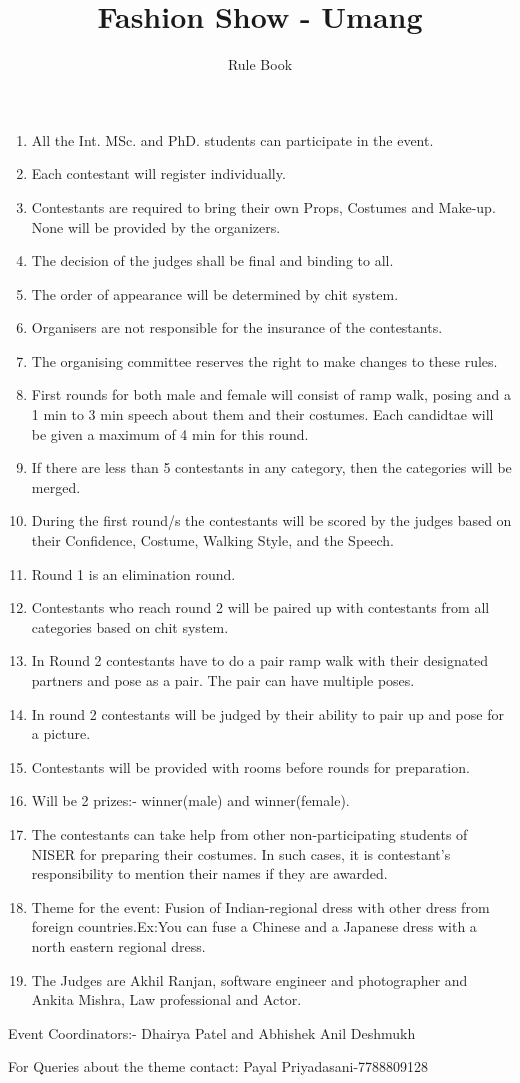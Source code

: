 \documentclass[a4paper, 11pt]{proc}
\begin{document}
\title{Fashion Show - Umang}
\author{Rule Book}
\maketitle
\begin{enumerate}
	\item All the Int. MSc. and PhD. students can participate in the event.
	\item Each contestant will register individually.
	\item Contestants are required to bring their own Props, Costumes and Make-up. None will be provided by the organizers.
	\item The decision of the judges shall be final and binding to all.
	\item The order of appearance will be determined by chit system.
	\item Organisers are not responsible for the insurance of the contestants.
	\item The organising committee reserves the right to make changes to these rules.
	\item First rounds for both male and female will consist of ramp walk, posing and a 1 min to 3 min speech about them and their costumes. Each candidtae will be given a maximum of 4 min for this round.
	\item If there are less than 5 contestants in any category, then the categories will be merged.
	\item During the first round/s the contestants will be scored by the judges based on their Confidence, Costume, Walking Style, and the Speech.
	\item Round 1 is an elimination round.
	\item Contestants who reach round 2 will be paired up with contestants from all categories based on chit system.
	\item In Round 2 contestants have to do a pair ramp walk with their designated partners and pose as a pair. The pair can have multiple poses.
	\item In round 2 contestants will be judged by their ability to pair up and pose for a picture.
	\item Contestants will be provided with rooms before rounds for preparation.
	\item Will be 2 prizes:- winner(male) and winner(female).
	\item The contestants can take help from other non-participating students of NISER for preparing their costumes. In such cases, it is contestant's responsibility to mention their names if they are awarded.
	\item Theme for the event: Fusion of Indian-regional dress with other dress from foreign countries.Ex:You can fuse a Chinese and a Japanese dress with a north eastern regional dress.
	\item The Judges are Akhil Ranjan, software engineer and photographer and Ankita Mishra, Law professional and Actor.
\end{enumerate}
Event Coordinators:- Dhairya Patel and Abhishek Anil Deshmukh

For Queries about the theme contact: Payal Priyadasani-7788809128
\end{document}
